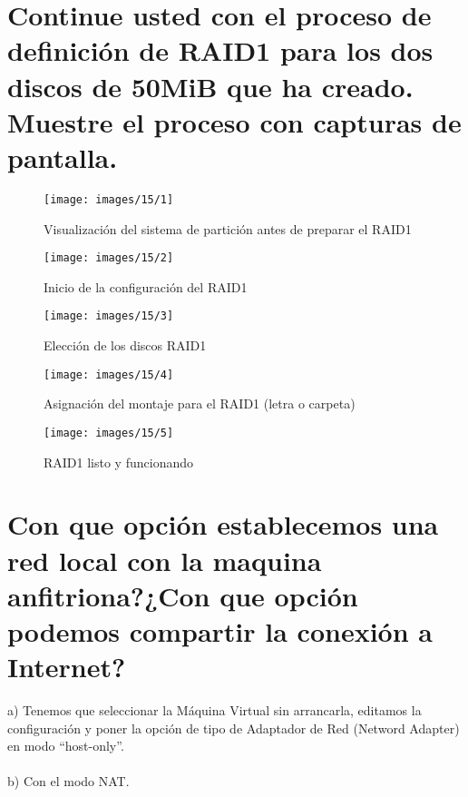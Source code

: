 \section{Continue usted con el proceso de definición de RAID1 para los dos discos de 50MiB que ha creado. Muestre el proceso con capturas de pantalla.}
\begin{figure}[H]
	\centering
	\texttt{[image: images/15/1]}
	\caption{Visualización del sistema de partición antes de preparar el RAID1}
	\label{fig:c1501}
\end{figure}
\begin{figure}[H]
	\centering
	\texttt{[image: images/15/2]}
	\caption{Inicio de la configuración del RAID1}
	\label{fig:c1502}
\end{figure}
\begin{figure}[H]
	\centering
	\texttt{[image: images/15/3]}
	\caption{Elección de los discos RAID1}
	\label{fig:c1503}
\end{figure}
\begin{figure}[H]
	\centering
	\texttt{[image: images/15/4]}
	\caption{Asignación del montaje para el RAID1 (letra o carpeta)}
	\label{fig:c1504}
\end{figure}
\begin{figure}[H]
	\centering
	\texttt{[image: images/15/5]}
	\caption{RAID1 listo y funcionando}
	\label{fig:c1505}
\end{figure}
\clearpage
\section{Con que opción establecemos una red local con la maquina anfitriona?¿Con que opción podemos compartir la conexión a Internet?}

a) Tenemos que seleccionar la Máquina Virtual sin arrancarla, editamos la configuración y poner la opción de tipo de Adaptador de Red (Netword Adapter) en modo “host-only”.\\\\
b) Con el modo NAT.\\


